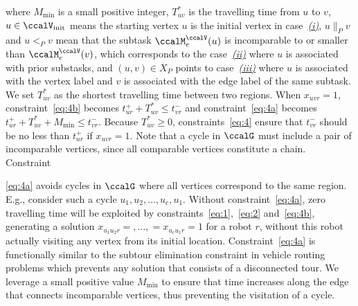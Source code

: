 \documentclass[Afour,sageh,times]{sagej}
\begin{document}
where $M_{\text{min}}$ is a small positive integer, $T^*_{uv}$ is the travelling time from $u$ to $v$, $u \in \ccalV_{\text{init}}$ means the starting vertex $u$ is the initial vertex in case~\hyperref[sec:a]{{\it (i)}}, $u \|_{P} v$ and $u<_{P} v$ mean that the subtask $\ccalM^\ccalV_{{e}}(u)$ is incomparable to or smaller than $\ccalM^\ccalV_e(v)$, which corresponds to the case~\hyperref[sec:b]{{\it (ii)}} where $u$ is associated with prior substasks, and $(u,v)\in X_P$ points to case~\hyperref[sec:c]{{\it (iii)}} where $u$ is associated with the vertex label and $v$ is associated with the edge label of the same subtask. We set $T^*_{uv}$ as the shortest travelling time between two regions. When $x_{uvr}=1$, constraint~\eqref{eq:4b} becomes $t_{ur}^+  + T^*_{uv}  \leq t_{vr}^-$ and constraint~\eqref{eq:4a} becomes $t_{ur}^+  + T^*_{uv} + M_{\text{min}}   \leq t_{vr}^-$. Because $T^*_{uv} \geq 0$, constraints~\eqref{eq:4} ensure that $t_{vr}^-$ should be no less than $t_{ur}^+$ if $x_{uvr}=1$. Note that a cycle in $\ccalG$ must include a pair of incomparable vertices, since all comparable vertices constitute a chain. Constraint~{\eqref{eq:4a} avoids cycles in $\ccalG$ where all vertices correspond to the same region. E.g., consider such a cycle $u_1,u_2,\ldots, u_c, u_1$. Without  constraint~\eqref{eq:4a}, zero travelling time will be exploited by constraints~\eqref{eq:1},~\eqref{eq:2} and~\eqref{eq:4b}, generating a solution $x_{u_1 u_2 r} = ,\ldots,=x_{u_c u_{1} r}= 1$ for a robot $r$, without this robot actually visiting any vertex from its initial location.  Constraint~\eqref{eq:4a} is functionally similar to the subtour elimination constraint in vehicle routing problems which prevents any solution that consists of a disconnected tour. We leverage a small positive value $M_{\text{min}}$ to ensure that time increases along the edge that connects incomparable vertices, thus preventing the visitation of a cycle.

}
\end{document}
